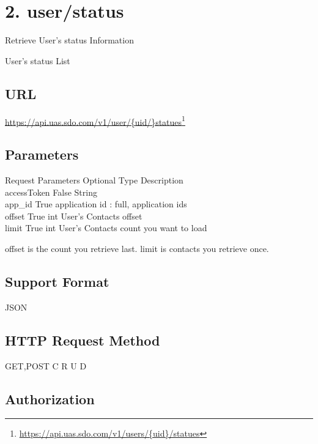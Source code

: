\chapter{2. user\slash status}
\label{userstatus}

Retrieve User's status Information

User's status List

\section{URL}
\label{url}

\href{https://api.uas.sdo.com/v1/users/{uid}/statues}{https:/\slash api.uas.sdo.com\slash v1\slash user\slash \{uid\slash \}statues}\footnote{\href{https://api.uas.sdo.com/v1/users/{uid}/statues}{https:/\slash api.uas.sdo.com\slash v1\slash users\slash \{uid\}\slash statues}}

\section{Parameters}
\label{parameters}

Request Parameters \textbar{} Optional \textbar{} Type \textbar{} Description\\
accessToken \textbar{} False \textbar{} String\textbar{}\\
app\_id \textbar{} True \textbar{} application id : full, application ids\\
offset \textbar{} True \textbar{} int \textbar{} User's Contacts offset\\
limit \textbar{} True \textbar{} int \textbar{} User's Contacts count you want to load 

offset is the count you retrieve last.
limit is contacts you retrieve once.

\section{Support Format}
\label{supportformat}

JSON

\section{HTTP Request Method}
\label{httprequestmethod}

GET,POST
C
R
U
D

\section{Authorization}
\label{authorization}

